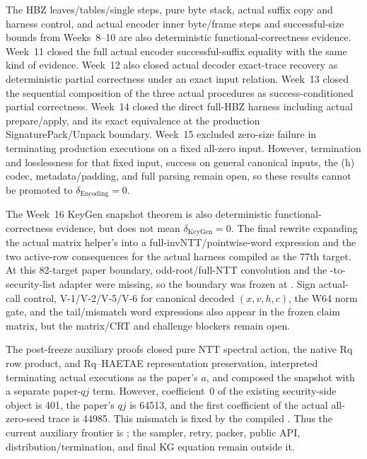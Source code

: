 The HBZ leaves/tables/single steps, pure byte stack, actual suffix copy and harness
control, and actual encoder inner byte/frame steps and successful-size bounds
from Weeks~8--10 are also deterministic functional-correctness evidence.
Week~11 closed the full actual encoder successful-suffix equality with the same
kind of evidence. Week~12 also closed actual decoder exact-trace recovery as
deterministic partial correctness under an exact input relation. Week~13 closed
the sequential composition of the three actual procedures as success-conditioned
partial correctness. Week~14 closed the direct full-HBZ harness including actual
prepare/apply, and its exact equivalence at the production SignaturePack/Unpack
boundary. Week~15 excluded zero-size failure in terminating production executions
on a fixed all-zero input. However, termination and losslessness for that fixed
input, success on general canonical inputs, the (h) codec, metadata/padding, and
full parsing remain open, so these results cannot be promoted to
\(\delta_{\mathrm{Encoding}}=0\).

The Week~16 KeyGen snapshot theorem is also deterministic
functional-correctness evidence, but does not mean
\(\delta_{\mathrm{KeyGen}}=0\). The final rewrite expanding the actual matrix
helper's  into a full-invNTT/pointwise-word expression and
the two active-row consequences for the actual harness compiled as the 77th
target. At this 82-target paper boundary, odd-root/full-NTT convolution and the
-to-security-list adapter were missing, so the boundary was
frozen at . Sign actual-call control, V-1/V-2/V-5/V-6 for
canonical decoded \((x,v,h,c)\), the W64 norm gate, and the tail/mismatch word
expressions also appear in the frozen claim matrix, but the matrix/CRT and
challenge blockers remain open.

The post-freeze auxiliary proofs closed pure NTT spectral action, the native Rq
row product, and Rq--HAETAE representation preservation, interpreted terminating
actual  executions as the paper's \(a\), and composed the
snapshot with a separate paper-\(qj\) term. However, coefficient~0 of the existing
security-side object is 401, the paper's \(qj\) is 64513, and the first
coefficient of the actual all-zero-seed trace is 44985. This mismatch is fixed by
the compiled . Thus the current
auxiliary frontier is ; the sampler, retry, packer,
public API, distribution/termination, and final KG equation remain outside it.

